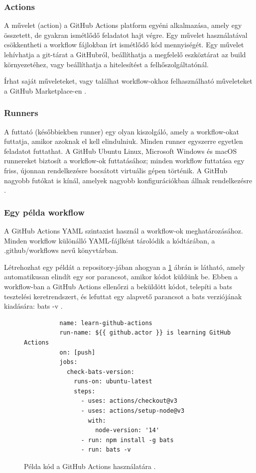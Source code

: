 \subsubsection*{Actions}
A művelet (action) a GitHub Actions platform egyéni alkalmazása, amely egy összetett, de gyakran ismétlődő feladatot hajt végre.
Egy művelet használatával csökkentheti a workflow fájlokban írt ismétlődő kód mennyiségét.
Egy művelet lehívhatja a git-tárat a GitHubról, beállíthatja a megfelelő eszköztárat az build környezetéhez, vagy beállíthatja a hitelesítést a felhőszolgáltatónál.

Írhat saját műveleteket, vagy találhat workflow-okhoz felhasználható műveleteket a GitHub Marketplace-en \cite{github}.

\subsubsection*{Runners}
A futtató (későbbiekben runner) egy olyan kiszolgáló, amely a workflow-okat futtatja, amikor azoknak el kell elindulniuk.
Minden runner egyszerre egyetlen feladatot futtathat.
A GitHub Ubuntu Linux, Microsoft Windows és macOS runnereket biztosít a workflow-ok futtatásához; minden workflow futtatása egy friss, újonnan rendelkezésre bocsátott virtuális gépen történik.
A GitHub nagyobb futókat is kínál, amelyek nagyobb konfigurációkban állnak rendelkezésre \cite{github}.

\subsubsection*{Egy példa workflow}
A GitHub Actions YAML szintaxist használ a workflow-ok meghatározásához.
Minden workflow különálló YAML-fájlként tárolódik a kódtárában, a .github/workflows nevű könyvtárban.

Létrehozhat egy példát a repository-jában ahogyan a \ref{sample-actions-config} ábrán is látható, amely automatikusan elindít egy sor parancsot, amikor kódot küldünk be.
Ebben a workflow-ban a GitHub Actions ellenőrzi a beküldött kódot, telepíti a bats tesztelési keretrendszert, és lefuttat egy alapvető parancsot a bats verziójának kiadására: bats -v \cite{github}.

\begin{figure}
  \centering
    \begin{minipage}{\linewidth}
      \begin{lstlisting}
          name: learn-github-actions
          run-name: ${{ github.actor }} is learning GitHub Actions
          on: [push]
          jobs:
            check-bats-version:
              runs-on: ubuntu-latest
              steps:
                - uses: actions/checkout@v3
                - uses: actions/setup-node@v3
                  with:
                    node-version: '14'
                - run: npm install -g bats
                - run: bats -v
      \end{lstlisting}
      \end{minipage}
  \caption{Példa kód a GitHub Actions használatára \cite{github}.}
  \label{sample-actions-config}
\end{figure}


